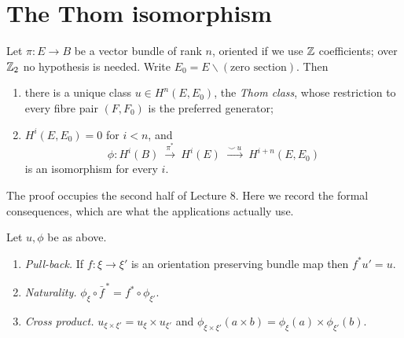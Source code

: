 \section{The Thom isomorphism}

\begin{theorem}\label{thm:thom}
Let $\pi\colon E\to B$ be a vector bundle of rank $n$, oriented if we use $\mathbb{Z}$
coefficients; over $\mathbb{Z}_2$ no hypothesis is needed. Write
$E_0=E\smallsetminus(\text{zero section})$. Then

\begin{enumerate}
\item there is a unique class $u\in H^n(E,E_0)$, the \emph{Thom class}, whose
restriction to every fibre pair $(F,F_0)$ is the preferred generator;
\item $H^i(E,E_0)=0$ for $i<n$, and
\[
\phi\colon H^i(B)\ \xrightarrow{\ \pi^*\ }\ H^i(E)
\ \xrightarrow{\ \smile\, u\ }\ H^{i+n}(E,E_0)
\]
is an isomorphism for every $i$.
\end{enumerate}
\end{theorem}

The proof occupies the second half of Lecture 8. Here we record the formal
consequences, which are what the applications actually use.

\begin{theorem}\label{thm:thom-properties}
Let $u,\phi$ be as above.

\begin{enumerate}
\item \emph{Pull-back.} If $f\colon\xi\to\xi'$ is an orientation preserving
bundle map then $f^*u'=u$.
\item \emph{Naturality.} $\phi_\xi\circ\bar f^{\,*}=f^*\circ\phi_{\xi'}$.
\item \emph{Cross product.} $u_{\xi\times\xi'}=u_\xi\times u_{\xi'}$ and
$\phi_{\xi\times\xi'}(a\times b)=\phi_\xi(a)\times\phi_{\xi'}(b)$.
\end{enumerate}
\end{theorem}

